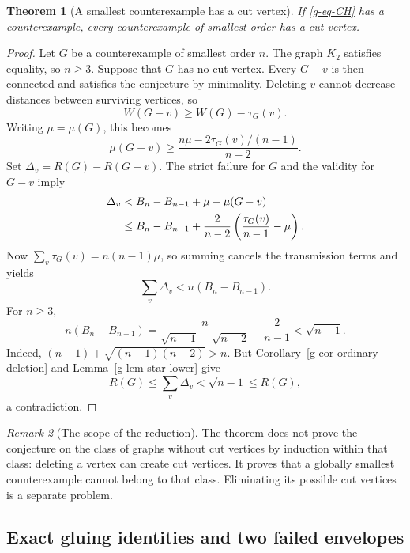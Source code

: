 \documentclass[11pt,a4paper]{article}
\newtheorem{theorem}{Theorem}[section]
\theoremstyle{definition}
\theoremstyle{remark}
\newtheorem{remark}[theorem]{Remark}
\begin{document}
\begin{theorem}[A smallest counterexample has a cut vertex]
\label{g-thm-cut-reduction}
If \eqref{g-eq-CH} has a counterexample, every counterexample of smallest
order has a cut vertex.
\end{theorem}

\begin{proof}
Let $G$ be a counterexample of smallest order $n$.  The graph $K_2$
satisfies equality, so $n\ge3$.  Suppose that $G$ has no cut vertex.
Every $G-v$ is then connected and satisfies the conjecture by minimality.
Deleting $v$ cannot decrease distances between surviving vertices, so
\[
 W(G-v)\ge W(G)-\tau_G(v).
\]
Writing $\mu=\mu(G)$, this becomes
\begin{equation}
 \mu(G-v)\ge
 \frac{n\mu-2\tau_G(v)/(n-1)}{n-2}.
 \label{g-eq-distance-deletion}
\end{equation}
Set $\Delta_v=R(G)-R(G-v)$.  The strict failure for $G$ and the validity
for $G-v$ imply
\begin{align}
 \Delta_v
 &< B_n-B_{n-1}+\mu-\mu(G-v)\notag\\
 &\le B_n-B_{n-1}
 +\frac2{n-2}\left(\frac{\tau_G(v)}{n-1}-\mu\right).
 \label{g-eq-counterexample-decrement}
\end{align}
Now $\sum_v\tau_G(v)=n(n-1)\mu$, so summing cancels the transmission
terms and yields
\[
 \sum_v\Delta_v<n(B_n-B_{n-1}).
\]
For $n\ge3$,
\[
 n(B_n-B_{n-1})
 =\frac n{\sqrt{n-1}+\sqrt{n-2}}-\frac2{n-1}
 <\sqrt{n-1}.
\]
Indeed, $(n-1)+\sqrt{(n-1)(n-2)}>n$.  But
Corollary~\ref{g-cor-ordinary-deletion} and
Lemma~\ref{g-lem-star-lower} give
\[
 R(G)\le\sum_v\Delta_v
 <\sqrt{n-1}\le R(G),
\]
a contradiction.
\end{proof}

\begin{remark}[The scope of the reduction]
The theorem does not prove the conjecture on the class of graphs without
cut vertices by induction within that class: deleting a vertex can create
cut vertices.  It proves that a globally smallest counterexample cannot
belong to that class.  Eliminating its possible cut vertices is a separate
problem.
\end{remark}

\subsection{Exact gluing identities and two failed envelopes}
\label{g-sub-gluing}
\end{document}
